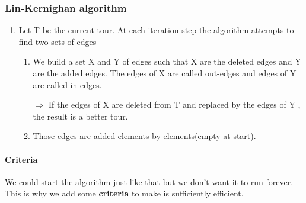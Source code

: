 \subsubsection{Lin-Kernighan algorithm}
\begin{enumerate}
    \item Let T be the current tour. At each iteration step the
        algorithm attempts to find two sets of edges

        \begin{enumerate}
            \item  We build a set X and Y of edges such that X are the
                deleted edges and Y are the added edges. The edges of X
                are called out-edges and edges of Y are called
                in-edges.

                $\Rightarrow$ If the edges of X are deleted from T and replaced by the
                edges of Y , the result is a better tour.                 
            \item Those edges are
                added elements by elements(empty at start).

        \end{enumerate}
\end{enumerate}

\paragraph{Criteria}

We could start the algorithm just like that but we don't want it to run
forever. This is why we add some \textbf{criteria} to make is sufficiently
efficient.

